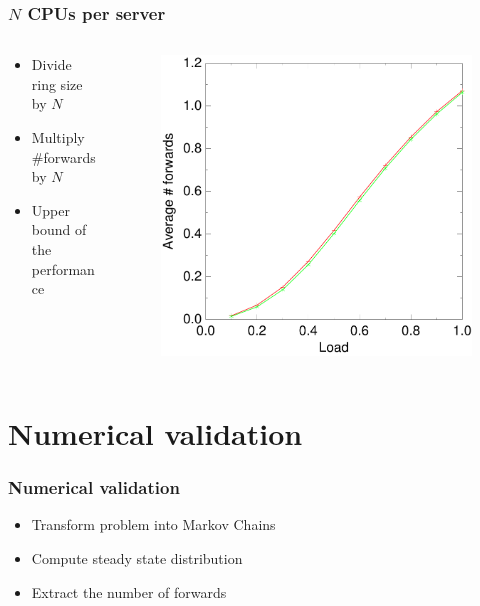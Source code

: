 \documentclass[compress]{beamer}
\begin{document}
\begin{frame}
\frametitle{$N$ CPUs per server}

\begin{columns}[t]
\begin{column}{0.45\textwidth}
\vspace{5em}
\begin{itemize}
 \item Divide ring size by $N$
 \item Multiply \#forwards by $N$
 \item Upper bound of the performance
\end{itemize}
\end{column}
\begin{column}{0.55\textwidth}
\begin{figure}[h!tb]
 \includegraphics[width=\textwidth]{../data/right_5_2.pdf}
 \end{figure}
\end{column}
\end{columns}

\end{frame}

\section{Numerical validation}

\begin{frame}
\frametitle{Numerical validation}
\begin{itemize}
 \item Transform problem into Markov Chains
 \item Compute steady state distribution
 \item Extract the number of forwards
\end{itemize}
\end{frame}
\end{document}
